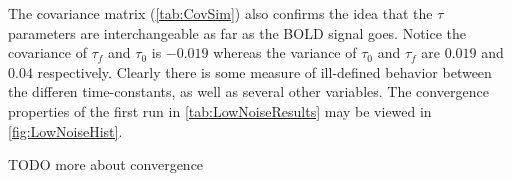 \begin{figure}
\label{fig:LowNoiseHist}
\end{figure}
The covariance matrix (\autoref{tab:CovSim}) also confirms the idea that the $\tau$ parameters are interchangeable
as far as the BOLD signal goes. Notice the covariance of $\tau_f$ and $\tau_0$ is $-0.019$ whereas
the variance of $\tau_0$ and $\tau_f$ are $0.019$ and $0.04$ respectively. Clearly there is 
some measure of ill-defined behavior between the differen time-constants, as well as several
other variables.  The convergence properties of the first run in \autoref{tab:LowNoiseResults} may be
viewed in \autoref{fig:LowNoiseHist}.

TODO more about convergence

